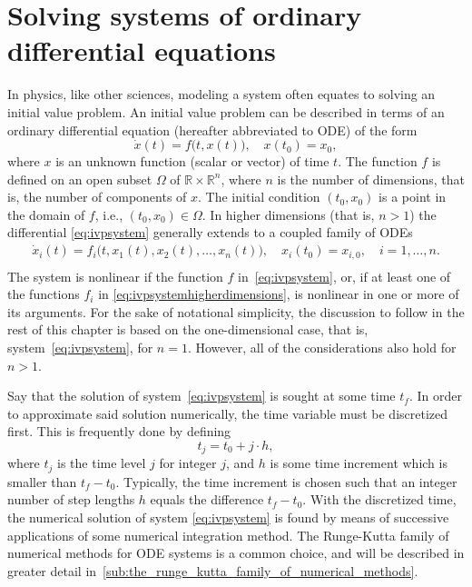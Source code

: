 \section[Solving systems of ordinary differential equations]%
{Solving systems of ordinary differential eq\hspace{0em}uations}
\label{sec:solvingsystems}

In physics, like other sciences, modeling a system often equates to solving
an initial value problem. An initial value problem can be described in terms
of an ordinary differential equation (hereafter abbreviated to ODE) of the form
\begin{equation}
    \label{eq:ivpsystem}
    \dot{x}(t) = f\big(t,x(t)\big),\quad{}x(t_{0})=x_{0},
\end{equation}
where $x$ is an unknown function (scalar or vector) of time $t$. The function
$f$ is defined on an open subset $\Omega$ of $\mathbb{R}\times\mathbb{R}^{n}$,
where $n$ is the number of dimensions, that is, the number of components
of $x$. The initial condition $(t_{0},x_{0})$ is a point in the domain of $f$, i.e.,
$(t_{0},x_{0})\in\Omega$. In higher dimensions (that is, $n>1$) the
differential \cref{eq:ivpsystem} generally extends to a coupled
family of ODEs
\begin{equation}
\label{eq:ivpsystemhigherdimensions}
\begin{gathered}
    \dot{x}_{i}(t) = f_{i}\big(t,x_{1}(t),x_{2}(t),\ldots,x_{n}(t)\big),\quad
    x_{i}(t_{0})=x_{i,0},\quad{}i=1,\ldots,n. \\
\end{gathered}
\end{equation}
The system is nonlinear if the function $f$ in~\cref{eq:ivpsystem},
or, if at least one of the functions $f_{i}$ in
\cref{eq:ivpsystemhigherdimensions}, is nonlinear in one or more of its
arguments. For the sake of notational simplicity, the discussion to follow
in the rest of this chapter is based on the one-dimensional case, that is,
system~\eqref{eq:ivpsystem}, for $n=1$. However, all of the considerations also
hold for $n>1$.

Say that the solution of system~\eqref{eq:ivpsystem} is sought at some time
$t_{f}$. In order to approximate said solution numerically, the time variable
must be discretized first. This is frequently done by defining
\begin{equation}
    \label{eq:discretetime}
    t_{j} = t_{0}+j\cdot{}h,
\end{equation}
where $t_{j}$ is the time level $j$ for integer $j$, and $h$ is some time
increment which is smaller than $t_{f}-t_{0}$. Typically, the time increment
is chosen such that an integer number of step lengths $h$ equals the difference
$t_{f}-t_{0}$. With the discretized time, the numerical solution of system
\eqref{eq:ivpsystem} is found by means of successive applications of some
numerical integration method. The Runge-Kutta family of numerical
methods for ODE systems is a common choice, and will be described in
greater detail in~\cref{sub:the_runge_kutta_family_of_numerical_methods}.

